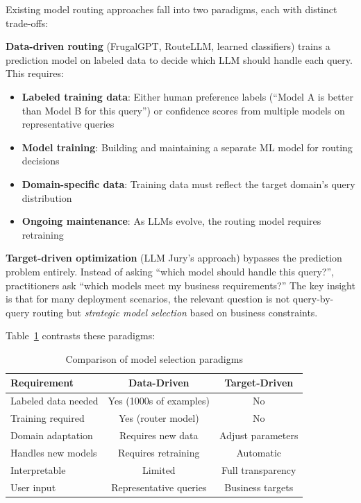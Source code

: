 \documentclass[11pt,a4paper]{article}
\begin{document}
Existing model routing approaches fall into two paradigms, each with distinct trade-offs:

\textbf{Data-driven routing} (FrugalGPT, RouteLLM, learned classifiers) trains a prediction model on labeled data to decide which LLM should handle each query. This requires:
\begin{itemize}
    \item \textbf{Labeled training data}: Either human preference labels (``Model A is better than Model B for this query'') or confidence scores from multiple models on representative queries
    \item \textbf{Model training}: Building and maintaining a separate ML model for routing decisions
    \item \textbf{Domain-specific data}: Training data must reflect the target domain's query distribution
    \item \textbf{Ongoing maintenance}: As LLMs evolve, the routing model requires retraining
\end{itemize}

\textbf{Target-driven optimization} (LLM Jury's approach) bypasses the prediction problem entirely. Instead of asking ``which model should handle this query?'', practitioners ask ``which models meet my business requirements?'' The key insight is that for many deployment scenarios, the relevant question is not query-by-query routing but \textit{strategic model selection} based on business constraints.

Table~\ref{tab:paradigm_comparison} contrasts these paradigms:

\begin{table}[h]
\centering
\caption{Comparison of model selection paradigms}
\label{tab:paradigm_comparison}
\begin{tabular}{@{}lcc@{}}
\toprule
\textbf{Requirement} & \textbf{Data-Driven} & \textbf{Target-Driven} \\
\midrule
Labeled data needed & Yes (1000s of examples) & No \\
Training required & Yes (router model) & No \\
Domain adaptation & Requires new data & Adjust parameters \\
Handles new models & Requires retraining & Automatic \\
Interpretable & Limited & Full transparency \\
User input & Representative queries & Business targets \\
\bottomrule
\end{tabular}
\end{table}
\end{document}
